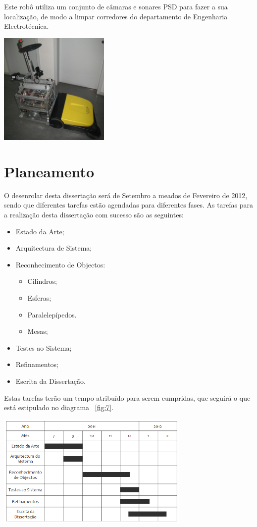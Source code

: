 Este robô utiliza um conjunto de câmaras e sonares PSD para fazer a sua localização,
de modo a limpar corredores do departamento de Engenharia Electrotécnica.

\begin{center}
	\includegraphics[width=0.40\textwidth]{figures/clean_rob.jpeg}
	\label{fig:6}
\end{center}


\section{Planeamento}

O desenrolar desta dissertação será de Setembro a meados de Fevereiro de 2012, sendo
que diferentes tarefas estão agendadas para diferentes fases. As tarefas para a realização
desta dissertação com sucesso são as seguintes:
\begin{itemize}
\item Estado da Arte;
\item Arquitectura de Sistema;
\item Reconhecimento de Objectos:
\begin{itemize}
\item Cilindros;
\item Esferas;
\item Paralelepípedos.
\item Mesas;
\end{itemize}
\item Testes ao Sistema;
\item Refinamentos;
\item Escrita da Dissertação.
\end{itemize}

Estas tarefas terão um tempo atribuído para serem cumpridas, que seguirá o que está estipulado no
diagrama ~\ref{fig:7}.

\begin{center}
	\includegraphics[width=0.70\textwidth]{figures/diss_timetable.PNG}
	\label{fig:7}
\end{center}

